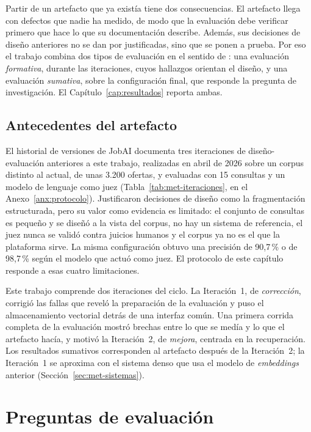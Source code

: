 Partir de un artefacto que ya existía tiene dos consecuencias. El artefacto llega con defectos que nadie ha medido, de modo que la evaluación debe verificar primero que hace lo que su documentación describe. Además, sus decisiones de diseño anteriores no se dan por justificadas, sino que se ponen a prueba. Por eso el trabajo combina dos tipos de evaluación en el sentido de \citet{Venable2016}: una evaluación \emph{formativa}, durante las iteraciones, cuyos hallazgos orientan el diseño, y una evaluación \emph{sumativa}, sobre la configuración final, que responde la pregunta de investigación. El Capítulo~\ref{cap:resultados} reporta ambas.

\subsection{Antecedentes del artefacto}
\label{sec:met-ciclos-previos}

El historial de versiones de JobAI documenta tres iteraciones de diseño-evaluación anteriores a este trabajo, realizadas en abril de 2026 sobre un corpus distinto al actual, de unas 3.200 ofertas, y evaluadas con 15 consultas y un modelo de lenguaje como juez (Tabla~\ref{tab:met-iteraciones}, en el Anexo~\ref{anx:protocolo}). Justificaron decisiones de diseño como la fragmentación estructurada, pero su valor como evidencia es limitado: el conjunto de consultas es pequeño y se diseñó a la vista del corpus, no hay un sistema de referencia, el juez nunca se validó contra juicios humanos y el corpus ya no es el que la plataforma sirve. La misma configuración obtuvo una precisión de 90,7\,\% o de 98,7\,\% según el modelo que actuó como juez. El protocolo de este capítulo responde a esas cuatro limitaciones.

Este trabajo comprende dos iteraciones del ciclo. La Iteración~1, de \emph{corrección}, corrigió las fallas que reveló la preparación de la evaluación y puso el almacenamiento vectorial detrás de una interfaz común. Una primera corrida completa de la evaluación mostró brechas entre lo que se medía y lo que el artefacto hacía, y motivó la Iteración~2, de \emph{mejora}, centrada en la recuperación. Los resultados sumativos corresponden al artefacto después de la Iteración~2; la Iteración~1 se aproxima con el sistema denso que usa el modelo de \textit{embeddings} anterior (Sección~\ref{sec:met-sistemas}).

\section{Preguntas de evaluación}
\label{sec:met-preguntas}

